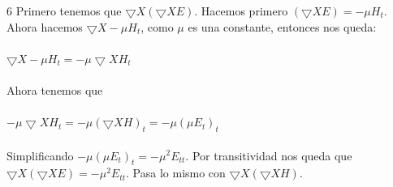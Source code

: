 \documentclass[a4paper,10pt]{article}
\begin{document}
6 Primero tenemos que $\bigtriangledown X (\bigtriangledown X E)$. Hacemos primero $(\bigtriangledown X E) = -\mu H_t$. Ahora hacemos $\bigtriangledown X  -\mu H_t$, como $\mu$ es una constante, entonces nos queda:\\\\
$\bigtriangledown X  -\mu H_t =  -\mu \bigtriangledown X  H_t$\\\\
Ahora tenemos que\\\\
$ -\mu \bigtriangledown X  H_t = -\mu (\bigtriangledown X H)_t =  -\mu (\mu E_t)_t $\\\\
Simplificando $-\mu (\mu E_t)_t = -\mu ^2 E_{tt}$. Por transitividad  nos queda que $\bigtriangledown X (\bigtriangledown X E) = -\mu ^2 E_{tt}$. 
Pasa lo mismo con $\bigtriangledown X (\bigtriangledown X H)$.
\end{document}

